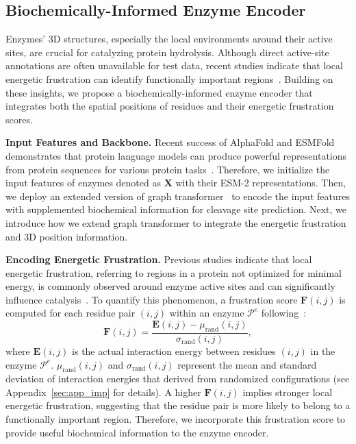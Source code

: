 \subsection{Biochemically-Informed Enzyme Encoder}
Enzymes’ 3D structures, especially the local environments around their active sites, are crucial for catalyzing protein hydrolysis. Although direct active-site annotations are often unavailable for test data, recent studies indicate that local energetic frustration can identify functionally important regions~\cite{energyfrustration}. Building on these insights, we propose a biochemically-informed enzyme encoder that integrates both the spatial positions of residues and their energetic frustration scores\cite{dai2021selfexplainablegraphneuralnetwork}.


\textbf{Input Features and Backbone.} Recent success of AlphaFold and ESMFold demonstrates that protein language models can produce powerful representations from protein sequences for various protein tasks~\cite{lin2023evolutionary}. Therefore, we initialize the input features of enzymes denoted as $\mathbf{X}$ with their ESM-2 representations. Then, we deploy an extended version of graph transformer~\cite{ying2021transformers,jumper2021highly} to encode the input features with supplemented biochemical information for cleavage site prediction.  Next, we introduce how we extend graph transformer to integrate the energetic frustration and 3D position information.  


\textbf{Encoding Energetic Frustration.} Previous studies indicate that local energetic frustration, referring to regions in a protein not optimized for minimal energy, is commonly observed around enzyme active sites and can significantly influence catalysis~\cite{energyfrustration}. To quantify this phenomenon, a frustration score $\mathbf{F}(i,j)$ is computed for each residue pair $(i,j)$ within an enzyme $\mathcal{P}^e$ following~\cite{energyfrustration}:
\begin{equation}
    \mathbf{F}(i,j) = \frac{ \mathbf{E}{(i,j)} - \mu_{\mathrm{rand}}(i,j) }{ \sigma_{\mathrm{rand}}(i,j) },
    \label{eq:energy cal}
\end{equation}
where $\mathbf{E}(i,j)$ is the actual interaction energy between residues \((i,j)\) in the enzyme $\mathcal{P}^e$. $\mu_\mathrm{rand}(i,j)$  and $\sigma_{\mathrm{rand}}(i,j)$ represent the mean and standard deviation of interaction energies that derived from randomized configurations (see Appendix~\ref{sec:app_imp} for details).
A higher $\mathbf{F}{(i,j)}$ implies stronger local energetic frustration, suggesting that the residue pair is more likely to belong to a functionally important region. Therefore, we incorporate this frustration score to provide useful biochemical information to the enzyme encoder. 



